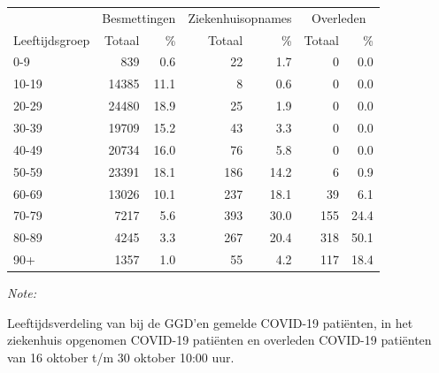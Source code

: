 \documentclass[
  english,
  man,floatsintext]{apa6}
\begin{document}
\begin{table}[H]
\centering\begingroup\fontsize{11}{13}\selectfont

\begin{threeparttable}
\begin{tabular}{lrrrrrr}
\toprule
\multicolumn{1}{c}{ } & \multicolumn{2}{c}{Besmettingen} & \multicolumn{2}{c}{Ziekenhuisopnames} & \multicolumn{2}{c}{Overleden} \\
\cmidrule(l{3pt}r{3pt}){2-3} \cmidrule(l{3pt}r{3pt}){4-5} \cmidrule(l{3pt}r{3pt}){6-7}
Leeftijdsgroep & Totaal & \% & Totaal & \% & Totaal & \%\\
\midrule
0-9 & 839 & 0.6 & 22 & 1.7 & 0 & 0.0\\
10-19 & 14385 & 11.1 & 8 & 0.6 & 0 & 0.0\\
20-29 & 24480 & 18.9 & 25 & 1.9 & 0 & 0.0\\
30-39 & 19709 & 15.2 & 43 & 3.3 & 0 & 0.0\\
40-49 & 20734 & 16.0 & 76 & 5.8 & 0 & 0.0\\
50-59 & 23391 & 18.1 & 186 & 14.2 & 6 & 0.9\\
60-69 & 13026 & 10.1 & 237 & 18.1 & 39 & 6.1\\
70-79 & 7217 & 5.6 & 393 & 30.0 & 155 & 24.4\\
80-89 & 4245 & 3.3 & 267 & 20.4 & 318 & 50.1\\
90+ & 1357 & 1.0 & 55 & 4.2 & 117 & 18.4\\
\bottomrule
\end{tabular}
\begin{tablenotes}
\item \textit{Note: } 
\item Leeftijdsverdeling van bij de GGD’en gemelde COVID-19 patiënten, in het ziekenhuis opgenomen COVID-19 patiënten en overleden COVID-19 patiënten van 16 oktober t/m 30 oktober 10:00 uur.
\end{tablenotes}
\end{threeparttable}
\endgroup{}
\end{table}
\end{document}

